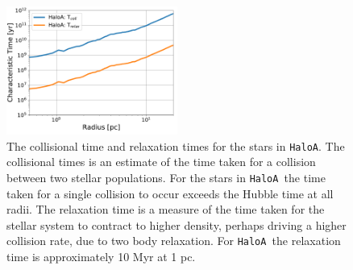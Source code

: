 \documentclass[twocolumn,iop,revtex4]{openjournal}
\newcommand{\ha} {\texttt{HaloA~}}
\newcommand{\hac} {\texttt{HaloA}}
\begin{document}
\begin{figure}
   \centering 
\includegraphics[width=0.5\textwidth]{FIGURES/CollisionalTime.pdf}
\caption{The collisional time and relaxation times for the stars in \hac. The collisional times is
  an estimate of the time taken for a collision between two stellar populations. For the stars
  in \ha the time taken for a single collision to occur exceeds the Hubble time at all radii.
  The relaxation time is a measure of the time taken for the stellar system to contract to
  higher density, perhaps driving a higher collision rate, due to
  two body relaxation. For \ha the relaxation time is approximately 10 Myr at 1 pc. }
\label{Fig:Collisions}
\end{figure}
\end{document}
